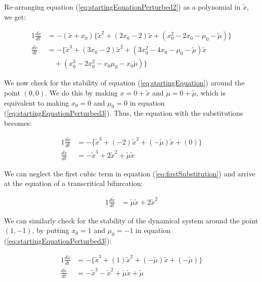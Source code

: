 \documentclass{article}
\begin{document}
Re-arranging equation (\ref{eq:startingEquationPerturbed2}) as a polynomial in $\tilde{x}$, we get:

	\begin{alignat}{1}
		\label{eq:startingEquationPerturbed3}
		\frac{d\tilde{x}}{dt} &= -(\tilde{x}+x_0)\{\tilde{x}^2 + (2x_0-2)\tilde{x} + (x_0^2-2x_0-\mu_0-\tilde{\mu})\} \nonumber \\		
		\frac{d\tilde{x}}{dt} &= -\{\tilde{x}^3 + (3x_0-2)\tilde{x}^2 + (3x_0^2-4x_0-\mu_0-\tilde{\mu})\tilde{x} \\&{\hspace{12pt}}   +(x_0^3 -2x_0^2 -x_0\mu_0 -x_0\tilde{\mu})\} \nonumber
	\end{alignat}	
	
	We now check for the stability of equation (\ref{eq:startingEquation}) around the point $(0,0)$. We do this by making $x = 0 + \tilde{x}$ and $\mu = 0 + \tilde{\mu}$, which is equivalent to making $x_0 = 0$ and $\mu_0 = 0$ in equation (\ref{eq:startingEquationPerturbed3}). Thus, the equation with the substitutions becomes:
	
	\begin{alignat}{1}
		\label{eq:firstSubstitution}
		\frac{d\tilde x}{dt} &= -\{\tilde{x}^3 + (-2)\tilde{x}^2 + (-\tilde{\mu})\tilde{x} +(0)\} \nonumber \\
		 \frac{d\tilde x}{dt} &= -\tilde{x}^3 + 2\tilde{x}^2 + \tilde{\mu}\tilde{x}
	\end{alignat}
	
	We can neglect the first cubic term in equation (\ref{eq:firstSubstitution}) and arrive at the equation of a transcritical bifurcation:
	
	\begin{alignat}{1}
		\frac{d\tilde{x}}{dt} &= \tilde{\mu}\tilde{x} + 2\tilde{x}^2
	\end{alignat}
	
	We can similarly check for the stability of the dynamical system around the point $(1,-1)$, by putting $x_0 = 1$ and $\mu_0 = -1$ in equation (\ref{eq:startingEquationPerturbed3}):
	
	\begin{alignat}{1}
		\frac{d\tilde{x}}{dt} &= -\{\tilde{x}^3 + (1)\tilde{x}^2 + (-\tilde{\mu})\tilde{x} + (-\tilde{\mu})\} \nonumber \\
		\frac{d\tilde{x}}{dt} &=  -\tilde{x}^3 - \tilde{x}^2 + \tilde{\mu}\tilde{x} + \tilde{\mu}
	\end{alignat}
\end{document}
